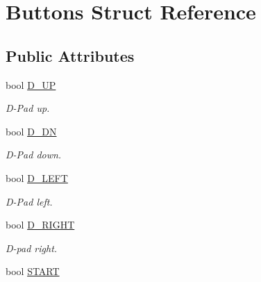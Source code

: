 \hypertarget{structButtons}{\section{Buttons Struct Reference}
\label{structButtons}
}
\subsection*{Public Attributes}
\begin{DoxyCompactItemize}
\item 
\hypertarget{structButtons_a238dc89035ee77a014e178682771d4a6}{bool \hyperlink{structButtons_a238dc89035ee77a014e178682771d4a6}{D\-\_\-\-U\-P}}\label{structButtons_a238dc89035ee77a014e178682771d4a6}

\begin{DoxyCompactList}\small\item\em D-\/\-Pad up. \end{DoxyCompactList}\item 
\hypertarget{structButtons_af501ffca5a32772f01caf174236586e2}{bool \hyperlink{structButtons_af501ffca5a32772f01caf174236586e2}{D\-\_\-\-D\-N}}\label{structButtons_af501ffca5a32772f01caf174236586e2}

\begin{DoxyCompactList}\small\item\em D-\/\-Pad down. \end{DoxyCompactList}\item 
\hypertarget{structButtons_ae63733c44c16a3504e8ac88c5fe4945c}{bool \hyperlink{structButtons_ae63733c44c16a3504e8ac88c5fe4945c}{D\-\_\-\-L\-E\-F\-T}}\label{structButtons_ae63733c44c16a3504e8ac88c5fe4945c}

\begin{DoxyCompactList}\small\item\em D-\/\-Pad left. \end{DoxyCompactList}\item 
\hypertarget{structButtons_ae172f4b3270c588275a4007c5b056c96}{bool \hyperlink{structButtons_ae172f4b3270c588275a4007c5b056c96}{D\-\_\-\-R\-I\-G\-H\-T}}\label{structButtons_ae172f4b3270c588275a4007c5b056c96}

\begin{DoxyCompactList}\small\item\em D-\/pad right. \end{DoxyCompactList}\item 
\hypertarget{structButtons_a3db0fd2465e9bff21bfdb4beeb37e93a}{bool \hyperlink{structButtons_a3db0fd2465e9bff21bfdb4beeb37e93a}{S\-T\-A\-R\-T}}\label{structButtons_a3db0fd2465e9bff21bfdb4beeb37e93a}


\end{DoxyCompactItemize}
